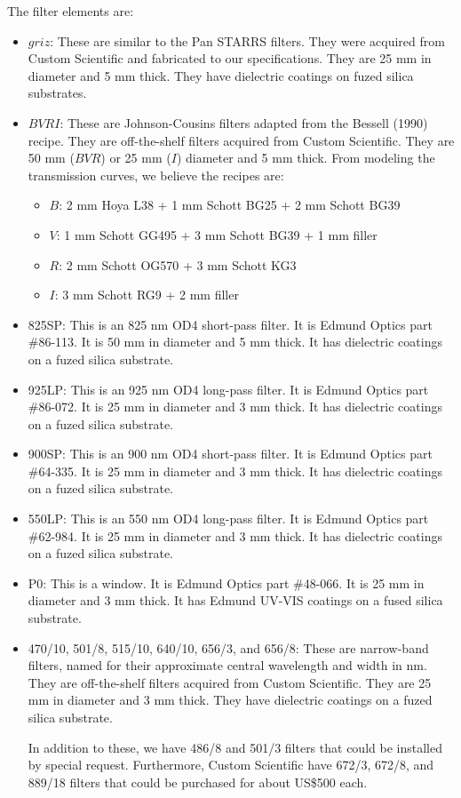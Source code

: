 The filter elements are:

\begin{itemize}
\item $griz$: These are similar to the Pan STARRS filters. They were acquired from Custom Scientific and fabricated to our specifications. They are 25 mm in diameter and 5 mm thick. They have dielectric coatings on fuzed silica substrates.
\item $BVRI$: These are Johnson-Cousins filters adapted from the Bessell (1990) recipe. They are off-the-shelf filters acquired from Custom Scientific. They are 50 mm ($BVR$) or 25 mm ($I$) diameter and 5 mm thick.
From modeling the transmission curves, we believe the recipes are:
\begin{itemize}
\item $B$: 2 mm Hoya L38 + 1 mm Schott BG25 + 2 mm Schott BG39
\item $V$: 1 mm Schott GG495 + 3 mm Schott BG39 + 1 mm filler
\item $R$: 2 mm Schott OG570 + 3 mm Schott KG3
\item $I$: 3 mm Schott RG9 + 2 mm filler
\end{itemize}
\item 825SP: This is an 825 nm OD4 short-pass filter. It is Edmund Optics part \#86-113. It is 50 mm in diameter and 5 mm thick. It has  dielectric coatings on a fuzed silica substrate.
\item 925LP: This is an 925 nm OD4 long-pass filter. It is Edmund Optics part \#86-072. It is 25 mm in diameter and 3 mm thick. It has  dielectric coatings on a fuzed silica substrate.
\item 900SP: This is an 900 nm OD4 short-pass filter. It is Edmund Optics part \#64-335. It is 25 mm in diameter and 3 mm thick. It has  dielectric coatings on a fuzed silica substrate.
\item 550LP: This is an 550 nm OD4 long-pass filter. It is Edmund Optics part \#62-984. It is 25 mm in diameter and 3 mm thick. It has dielectric coatings on a fuzed silica substrate.
\item P0: This is a window. It is Edmund Optics part \#48-066. It is 25 mm in diameter and 3 mm thick. It has Edmund UV-VIS coatings on a fused silica substrate.
\item 470/10, 501/8, 515/10, 640/10, 656/3, and 656/8: These are narrow-band filters, named for their approximate central wavelength and width in nm. They are off-the-shelf filters acquired from Custom Scientific. They are 25 mm in diameter and 3 mm thick. They have dielectric coatings on a fuzed silica substrate.

In addition to these, we have 486/8 and 501/3 filters that could be installed by special request. Furthermore, Custom Scientific have 672/3, 672/8, and 889/18 filters that could be purchased for about US\$500 each.
\end{itemize}

